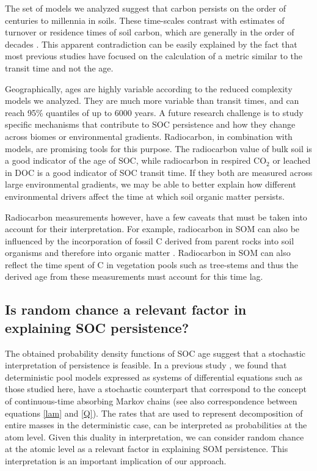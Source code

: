 \documentclass[draft,linenumbers]{agujournal}
\begin{document}
The set of models we analyzed suggest that carbon persists on the order of centuries to millennia in soils. These time-scales contrast with estimates of turnover or residence times of soil carbon, which are generally in the order of decades \citep{Carvalhais2014, Wang2018}. This apparent contradiction can be easily explained by the fact that most previous studies have focused on the calculation of a metric similar to the transit time and not the age. 

Geographically, ages are highly variable according to the reduced complexity models we analyzed. They are much more variable than transit times, and can reach 95\% quantiles of up to 6000 years. A future research challenge is to study specific mechanisms that contribute to SOC persistence and how they change across biomes or environmental gradients. Radiocarbon, in combination with models, are promising tools for this purpose. The radiocarbon value of bulk soil is a good indicator of the age of SOC, while radiocarbon in respired CO$_2$ or leached in DOC is a good indicator of SOC transit time. If they both are measured across large environmental gradients, we may be able to better explain how different environmental drivers affect the time at which soil organic matter persists. 

Radiocarbon measurements however, have a few caveats that must be taken into account for their interpretation. For example, radiocarbon in SOM can also be influenced by the incorporation  of fossil C derived from parent rocks into soil organisms and therefore into organic matter \citep{Seifert2013}. Radiocarbon in SOM can also reflect the time spent of C in vegetation pools such as tree-stems and thus the derived age from these measurements must account for this time lag.

\subsection{Is random chance a relevant factor in explaining SOC persistence?}
The obtained probability density functions of SOC age suggest that a stochastic interpretation of persistence is feasible. In a previous study \citep{Metzler2018MG}, we found that deterministic pool models expressed as systems of differential equations such as those studied here, have a stochastic counterpart that correspond to the concept of continuous-time absorbing Markov chains (see also correspondence between equations \ref{lam} and \ref{Q}). The rates that are used to represent decomposition of entire masses in the deterministic case, can be interpreted as probabilities at the atom level. Given this duality in interpretation, we can consider random chance at the atomic level as a relevant factor in explaining SOM persistence. This interpretation is an important implication of our approach. 
\end{document}
